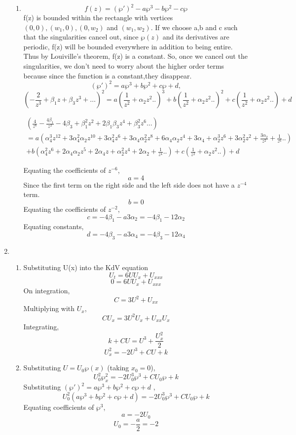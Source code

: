 \documentclass[a4paper]{article}
\begin{document}
\begin{enumerate}
\begin{enumerate}
\item
\[ f(z) =(\wp')^2-a \wp^3-b \wp^2-c \wp \]
f(z) is bounded within the rectangle with vertices $(0,0), (w_1,0), (0,w_2)$ and $(w_1,w_2)$.
If we choose a,b and c such that the singularities cancel out, since $\wp(z)$ and its derivatives are periodic, f(z) will be bounded everywhere in addition to being entire.  Thus by Louiville's theorem, f(z) is a constant. So, once we cancel out the singularities, we don't need to worry about the higher order terms because since the function is a constant,they disappear.
\[
(\wp')^2=a \wp^3+b \wp^2+c \wp+d,
\]
\[
(-\frac{2}{z^3}+\beta_1 z+\beta_3 z^3+\ldots)^2=a (\frac{1}{z^2}  +\alpha_2 z^2 ..)^3+b (\frac{1}{z^2}  +\alpha_2 z^2 ..)^2+c(\frac{1}{z^2}  +\alpha_2 z^2 ..) +d
\]
		                         	\begin{center}             
		                         		\begin{gather*}
(\frac{4}{z^6} -\frac{4\beta_1}{z^2} -4  \beta_3+\beta_1^2z^2+2\beta_1\beta_3 z^4 +\beta_3^2 z^6 ...)\\=a (\alpha_4^3 z^{12}+3 \alpha_4^2 \alpha_2 z^{10}+3 \alpha_4^2 z^6+3 \alpha_4 \alpha_2^2 z^8+6 \alpha_4 \alpha_2z^4+3 \alpha_4+\alpha_2^3 z^6+3 \alpha_2^2 z^2+\frac{3 \alpha_2}{z^2}+\frac{1}{z^6}..)\\+b (\alpha_4^2 z^6+2 \alpha_4 \alpha_2 z^5+2 \alpha_4 z+\alpha_2^2 z^4+2 \alpha_2+\frac{1}{z^4} ..)+c(\frac{1}{z^2}  +\alpha_2 z^2 ..) +d 	\end{gather*} 
\end{center}
Equating the coefficients of $z^{-6}$,
\[a=4\]
Since the first term on the right side and the left side does not have a $z^{-4}$ term.
\[b=0\]
Equating the coefficients of $z^{-2}$,
\[c =-4\beta_1-a3\alpha_2= -4\beta_1-12\alpha_2 \]
Equating constants,
\[d= -4 \beta_3 -a3\alpha_4 = -4 \beta_3 -12\alpha_4 \]




			
\end{enumerate} 
\item 
\begin {enumerate}
\item 
Substituting U(x) into the KdV equation
\[  U_t = 6UU_x +U_{xxx} \]
\[  0 = 6UU_x +U_{xxx} \]
On integration,
\[  C = 3U^2 +U_{xx} \]
Multiplying with $U_x$,
\[  CU_x = 3U^2U_x +U_{xx}U_x \]
Integrating,
\[ k+ CU = U^3  + \frac{U_x ^2}{2} \]
\[ U_x ^2= -2 U^3 +CU +k  \]
\item 
Substituting $U = U_0 \wp(x)$ (taking $x_0=0$),
\[U_0^2\wp_x^2= -2U_0^3\wp^3 +CU_0\wp+k\]
Substituting $(\wp')^2=a \wp^3+b \wp^2+c \wp+d $ ,
\[
U_0^2(a \wp^3+b \wp^2+c \wp+d)=-2U_0^3\wp^3 +CU_0\wp+k
\]
Equating coefficients of $\wp^3$,
\[a = -2U_0\]
\[U_0= -\frac{a}{2}=-2 \]



\end{enumerate}
\end{enumerate}
\end{document}
